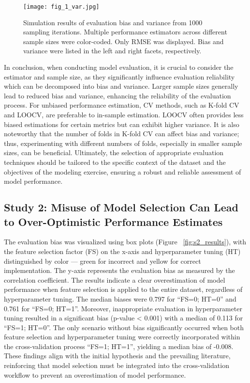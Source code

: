 \begin{figure}[h]
    \centering
    \texttt{[image: fig\_1\_var.jpg]}
    \caption{Simulation results of evaluation bias and variance from 1000 sampling iterations. Multiple performance estimators across different sample sizes were color-coded. Only RMSE was displayed. Bias and variance were listed in the left and right facets, respectively.}
    \label{fig:s1_var}
\end{figure}

In conclusion, when conducting model evaluation, it is crucial to consider the estimator and sample size, as they significantly influence evaluation reliability which can be decomposed into bias and variance. Larger sample sizes generally lead to reduced bias and variance, enhancing the reliability of the evaluation process. For unbiased performance estimation, CV methods, such as K-fold CV and LOOCV, are preferable to in-sample estimation. LOOCV often provides less biased estimations for certain metrics but can exhibit higher variance. It is also noteworthy that the number of folds in K-fold CV can affect bias and variance; thus, experimenting with different numbers of folds, especially in smaller sample sizes, can be beneficial. Ultimately, the selection of appropriate evaluation techniques should be tailored to the specific context of the dataset and the objectives of the modeling exercise, ensuring a robust and reliable assessment of model performance.

\subsection{Study 2: Misuse of Model Selection Can Lead to Over-Optimistic Performance Estimates}

The evaluation bias was visualized using box plots (Figure ~\ref{fig:s2_results}), with the feature selection factor (FS) on the x-axis and hyperparameter tuning (HT) distinguished by color — green for incorrect and yellow for correct implementation. The y-axis represents the evaluation bias as measured by the correlation coefficient. The results indicate a clear overestimation of model performance when feature selection is applied to the entire dataset, regardless of hyperparameter tuning. The median biases were 0.797 for “FS=0; HT=0” and 0.761 for “FS=0; HT=1”. Moreover, inappropriate evaluation in hyperparameter tuning resulted in a significant bias (p-value < 0.001) with a median of 0.113 for “FS=1; HT=0”. The only scenario without bias significantly occurred when both feature selection and hyperparameter tuning were correctly incorporated within the cross-validation process “FS=1; HT=1”, yielding a median bias of -0.008. These findings align with the initial hypothesis and the prevailing literature, reinforcing that model selection must be integrated into the cross-validation workflow to prevent an overestimation of model performance.

